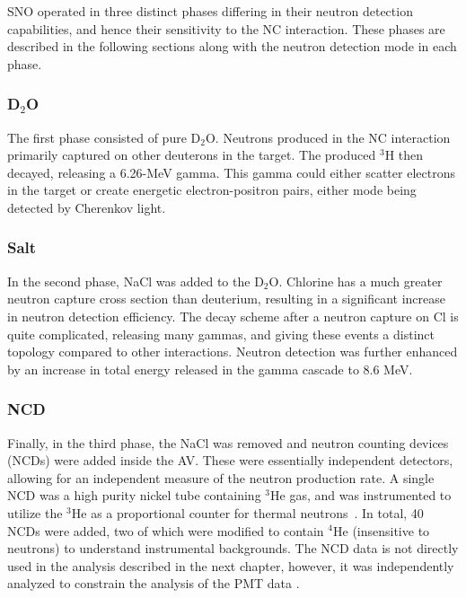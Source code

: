 SNO operated in three distinct phases differing in their neutron detection capabilities, and hence their sensitivity to the NC interaction.
These phases are described in the following sections along with the neutron detection mode in each phase.

\subsubsection{D$_2$O}

The first phase consisted of pure D$_2$O. 
Neutrons produced in the NC interaction primarily captured on other deuterons in the target.
The produced $^3$H then decayed, releasing a 6.26-MeV gamma.
This gamma could either scatter electrons in the target or create energetic electron-positron pairs, either mode being detected by Cherenkov light.

\subsubsection{Salt}

In the second phase, NaCl was added to the D$_2$O.
Chlorine has a much greater neutron capture cross section than deuterium, resulting in a significant increase in neutron detection efficiency.
The decay scheme after a neutron capture on Cl is quite complicated, releasing many gammas, and giving these events a distinct topology compared to other interactions.
Neutron detection was further enhanced by an increase in total energy released in the gamma cascade to 8.6 MeV.

\subsubsection{NCD}

Finally, in the third phase, the NaCl was removed and neutron counting devices (NCDs) were added inside the AV.
These were essentially independent detectors, allowing for an independent measure of the neutron production rate.
A single NCD was a high purity nickel tube containing $^3$He gas, and was instrumented to utilize the $^3$He as a proportional counter for thermal neutrons~\cite{ncd}.
In total, 40 NCDs were added, two of which were modified to contain $^4$He (insensitive to neutrons) to understand instrumental backgrounds.
The NCD data is not directly used in the analysis described in the next chapter, however, it was independently analyzed to constrain the analysis of the PMT data \cite{sno_ncd_psa,3phase}.

